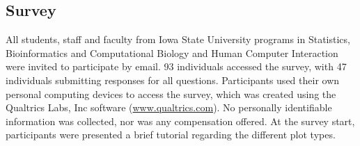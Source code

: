 
% 




\subsection*{Survey }\label{app2}
All students, staff and faculty from Iowa State University programs in Statistics, Bioinformatics and Computational Biology and Human Computer Interaction were invited to participate by email. 93 individuals accessed the survey, with 47 individuals submitting responses for all questions. Participants used their own personal computing devices to access the survey, which was created using the  Qualtrics Labs, Inc software (\url{www.qualtrics.com}). No personally identifiable information was collected, nor was any compensation offered. At the survey start, participants were presented a brief tutorial regarding the different plot types.  \\

